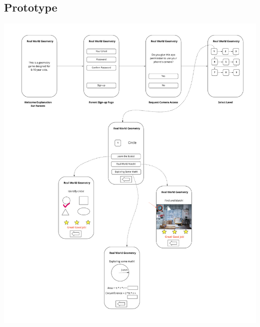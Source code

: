\documentclass[acmsmall, nonacm]{acmart}
\begin{document}
\begin{appendices}
  \section{Prototype}
  \label{appendix:prototype}
  \includegraphics[width=\textwidth]{prototype.jpg}

\end{appendices}
\end{document}
